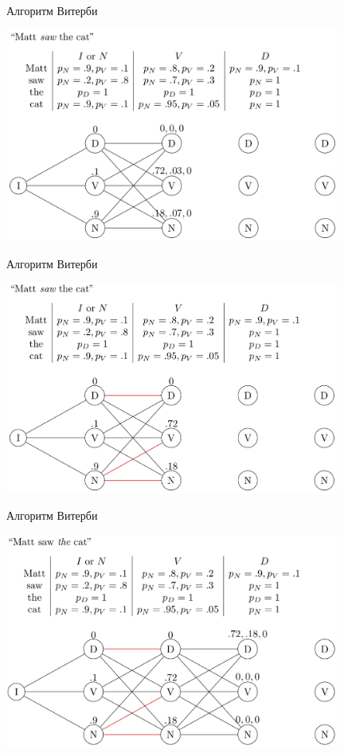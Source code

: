\documentclass{beamer}
\begin{document}
\begin{frame}{Алгоритм Витерби}
\centerline{\includegraphics[width=11cm]{fig/3.png}}
\end{frame}

\begin{frame}{Алгоритм Витерби}
\centerline{\includegraphics[width=11cm]{fig/4.png}}
\end{frame}

\begin{frame}{Алгоритм Витерби}
\centerline{\includegraphics[width=11cm]{fig/5.png}}
\end{frame}
\end{document}
